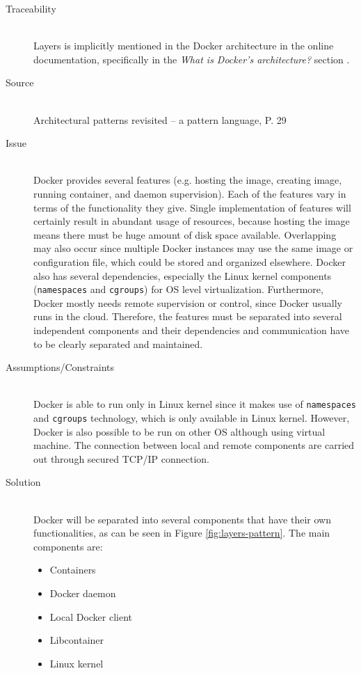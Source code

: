\begin{description}
\item [Traceability]~\\
Layers is implicitly mentioned in the Docker architecture in the online
documentation, specifically in the \textit{What is Docker’s architecture?}
section \cite{dockerarchi}.

\item [Source]~\\
Architectural patterns revisited -- a pattern language, P. 29
\cite{avgeriou2005architectural}

\item [Issue]~\\
Docker provides several features (e.g. hosting the image, creating image, running container, and daemon supervision). Each of the features vary in terms of the functionality they give. Single implementation of features will certainly result in abundant usage of resources, because hosting the image means there must be huge amount of disk space available.
%
Overlapping may also occur since multiple Docker instances may use the same image or configuration file, which could be stored and organized elsewhere. Docker also has several dependencies, especially the Linux kernel components (\texttt{namespaces} and \texttt{cgroups}) for OS level virtualization.
Furthermore, Docker mostly needs remote supervision or control, since Docker usually runs in the cloud. Therefore, the features must be separated into several independent components and their dependencies and communication have to be clearly separated and maintained.

\item [Assumptions/Constraints]~\\
Docker is able to run only in Linux kernel since it makes use of
\texttt{namespaces} and \texttt{cgroups} technology, which is only available in
Linux kernel. However, Docker is also possible to be run on other OS
although using virtual machine. The connection between local and remote
components are carried out through secured TCP/IP connection.

\item [Solution]~\\
Docker will be separated into several components that have their own
functionalities, as can be seen in Figure \ref{fig:layers-pattern}. The main components are:
\begin{itemize}
    \item Containers
    \item Docker daemon
    \item Local Docker client
    \item Libcontainer
    \item Linux kernel
\end{itemize}


\end{description}
